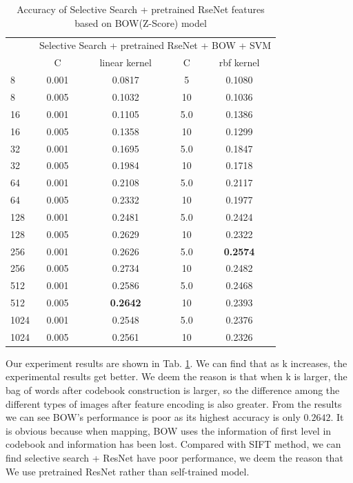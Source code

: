 \documentclass[conference]{IEEEtran}
\begin{document}
\begin{table}[htbp]
	\centering
	\newcommand{\tabincell}[2]{\begin{tabular}{@{}#1@{}}#2\end{tabular}}
	\renewcommand\arraystretch{1.0}
	\caption{Accuracy of Selective Search + pretrained RseNet features based on BOW(Z-Score) model}
	\label{kbase1}%
	\begin{tabular}{@{}p{1cm}<{\centering}|c|c|c|c}
		\hline
		\multirow{2}{*}{\diagbox[height=2\line,width=1.42cm,font=\tiny]{$k$}{Acc.}{$\mathit{M}$}} &
		\multicolumn{4}{c}{Selective Search + pretrained RseNet + BOW + SVM}\\
		\cline{2-5}
		& {C} & {linear kernel} & {C} & {rbf kernel}\\
		\hline
		8   & 0.001 & 0.0817 & 5 & 0.1080\\
        8   & 0.005  & 0.1032 & 10 & 0.1036\\
        \hline
		16   & 0.001  & 0.1105 & 5.0 & 0.1386\\
        16   & 0.005  & 0.1358 & 10 & 0.1299\\
        \hline
		32   & 0.001  & 0.1695 & 5.0 & 0.1847\\
        32   & 0.005  & 0.1984 & 10 & 0.1718\\
        \hline
		64   & 0.001  & 0.2108 & 5.0 & 0.2117\\
        64   & 0.005  & 0.2332 & 10 & 0.1977\\
        \hline
		128   & 0.001  & 0.2481 & 5.0 & 0.2424\\
        128   & 0.005  & 0.2629 & 10 & 0.2322\\
        \hline
		256   & 0.001  & 0.2626 & 5.0 & \textbf{0.2574}\\
        256   & 0.005  & 0.2734 & 10 & 0.2482\\
        \hline
		512   & 0.001  & 0.2586 & 5.0 & 0.2468\\
        512   & 0.005  & \textbf{0.2642} & 10 & 0.2393\\
        \hline
		1024   & 0.001  & 0.2548 & 5.0 & 0.2376\\
		1024   & 0.005  & 0.2561 & 10 & 0.2326\\
		\hline
	\end{tabular}
\end{table}

Our experiment results are shown in Tab. \ref{kbase1}. We can find that as k increases, the experimental results get better. We deem the reason is that when k is larger, the bag of words after codebook construction is larger, so the difference among the different types of images after feature encoding is also greater. From the results we can see BOW's performance is poor as its highest accuracy is only $0.2642$. It is obvious because when mapping, BOW uses the information of first level in codebook and information has been lost. Compared with SIFT method, we can find selective search + ResNet have poor performance, we deem the reason that We use pretrained ResNet rather than self-trained model.
\end{document}
